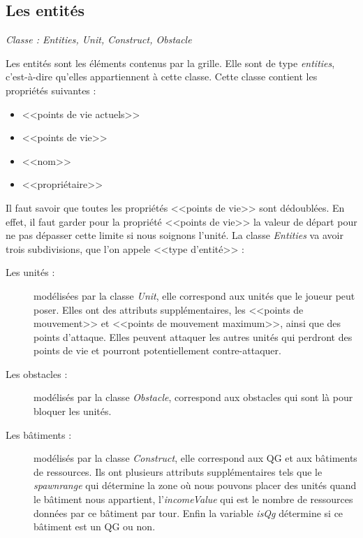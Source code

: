 \documentclass[a4paper, titlepage]{livret}
\begin{document}
        \subsection{Les entités}
          \begin{center}
           \textit{Classe : Entities, Unit, Construct, Obstacle}
          \end{center}
          Les entités sont les éléments contenus par la grille. Elle sont de type \textit{entities}, c'est-à-dire qu'elles appartiennent à cette classe. Cette classe contient les propriétés suivantes :
          \begin{itemize}
            \item <<points de vie actuels>>
            \item <<points de vie>>
            \item <<nom>>
            \item <<propriétaire>>
          \end{itemize}
          Il faut savoir que toutes les propriétés <<points de vie>> sont dédoublées. En effet, il faut garder pour la propriété <<points de vie>> la valeur de départ pour ne pas dépasser cette limite si nous soignons l'unité.
          La classe \textit{Entities} va avoir trois subdivisions, que l'on appele <<type d'entité>> :
          \begin{description}
            \item[Les unités :] modélisées par la classe \textit{Unit}, elle correspond aux unités que le joueur peut poser. Elles ont des attributs supplémentaires, les <<points de mouvement>> et <<points de mouvement maximum>>, ainsi que des points d'attaque. Elles peuvent attaquer les autres unités qui perdront des points de vie et pourront potentiellement contre-attaquer.
            \item[Les obstacles :] modélisés par la classe \textit{Obstacle}, correspond aux obstacles qui sont là pour bloquer les unités.
            \item[Les bâtiments :] modélisés par la classe \textit{Construct}, elle correspond aux QG et aux bâtiments de ressources. Ils ont plusieurs attributs supplémentaires tels que le \textit{spawnrange} qui détermine la zone où nous pouvons placer des unités quand le bâtiment nous appartient, l'\textit{incomeValue} qui est le nombre de ressources données par ce bâtiment par tour. Enfin la variable \textit{isQg} détermine si ce bâtiment est un QG ou non.
          \end{description}
\end{document}
